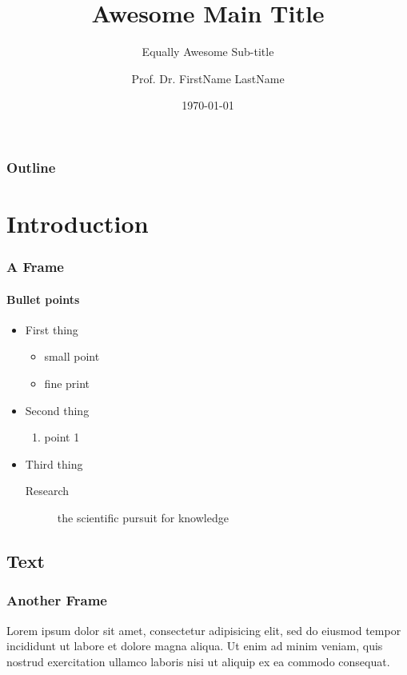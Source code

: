 \documentclass[smaller]{beamer}
\title[Event Name or Short Title]{Awesome Main Title}
\subtitle{Equally Awesome Sub-title}
\author[Short author name]{Prof. Dr. FirstName LastName}
\date{\today}
\begin{document}
\begin{frame}[plain]
    \titlepage
\end{frame}

\begin{frame}%
    \frametitle{Outline}
    \tableofcontents
\end{frame}


\section{Introduction}
\begin{frame}
    \frametitle{A Frame}
    \framesubtitle{Bullet points}
    \begin{itemize}
        \item First thing
            \begin{itemize}
                \item small point
                \item fine print
            \end{itemize}
        \item Second thing
            \begin{enumerate}
                \item point 1
            \end{enumerate}
        \item Third thing
            \begin{description}
                \item[Research] the scientific pursuit for knowledge
            \end{description}
    \end{itemize}
\end{frame}

\subsection{Text}
\begin{frame}
    \frametitle{Another Frame}
    Lorem ipsum dolor sit amet, consectetur adipisicing elit, sed do eiusmod tempor incididunt ut labore et dolore magna aliqua. Ut enim ad minim veniam, quis nostrud exercitation ullamco laboris nisi ut aliquip ex ea commodo consequat.
\end{frame}
\end{document}
